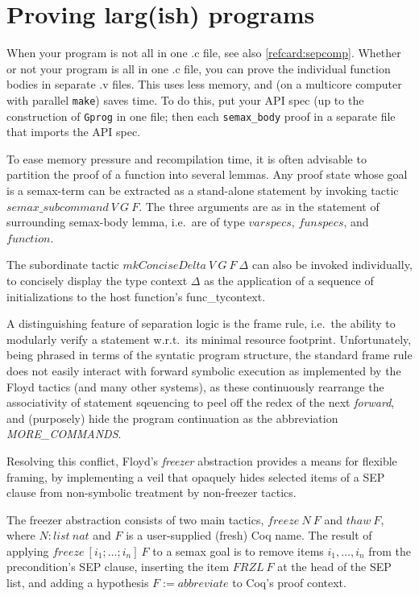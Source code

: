 \documentclass[12pt,fleqn,openany,oneside,showtrims]{memoir}
\begin{document}
\chapter{Proving larg(ish) programs}

When your program is not all in one .c file,
see also \autoref{refcard:sepcomp}.
Whether or not your program is all in one .c file,
you can prove the individual function bodies in separate .v files.
This uses less memory, and (on a multicore computer with
parallel \lstinline{make}) saves time.
To do this, put your API spec (up to the construction
of \lstinline{Gprog} in one file;
then each \lstinline{semax_body} proof in a separate file
that imports the API spec.

To ease memory pressure and recompilation time, it is often advisable
to partition the proof of a function into several lemmas. Any proof
state whose goal is a semax-term can be extracted as a stand-alone
statement by invoking tactic $\mathit{semax\_subcommand}\ V\ G\ F$.
The three arguments are as in the statement of surrounding semax-body
lemma, i.e.~are of type $\mathit{varspecs}$, $\mathit{funspecs}$, and
$\mathit{function}$.

\label{refcard:mkConciseDelta}
The subordinate tactic $\mathit{mkConciseDelta}\ V\ G\ F\ \Delta$ can
also be invoked individually, to concisely display the type context $\Delta$
as the application of a sequence of initializations
to the host function's func\_tycontext.

\label{freezer}
A distinguishing feature of separation logic is the frame rule,
i.e.~the ability to modularly verify a statement w.r.t.~its minimal
resource footprint. Unfortunately, being phrased in terms of the
syntatic program structure, the standard frame rule does not easily
interact with forward symbolic execution as implemented by the Floyd
tactics (and many other systems), as these continuously rearrange the
associativity of statement sqeuencing to peel off the redex of the
next \emph{forward}, and (purposely) hide the program continuation as
the abbreviation \emph{MORE\_COMMANDS}.

Resolving this conflict, Floyd's \emph{freezer} abstraction provides a
means for flexible framing, by implementing a veil that opaquely hides
selected items of a SEP clause from non-symbolic treatment by
non-freezer tactics.

The freezer abstraction consists of two main tactics, $\mathit{freeze}\
N\ F$ and $\mathit{thaw}\ F$, where $N:\mathit{list\ nat}$ and $F$ is
a user-supplied (fresh) Coq name. The result of applying
$\mathit{freeze}\ [i_1;\ldots;i_n]\ F$ to a semax goal is to remove
items $i_1,\ldots,i_n$ from the precondition's SEP clause, inserting
the item $\mathit{FRZL}\ F$ at the head of the SEP list, and adding a
hypothesis $F := \mathit{abbreviate}$ to Coq's proof context.
\end{document}
